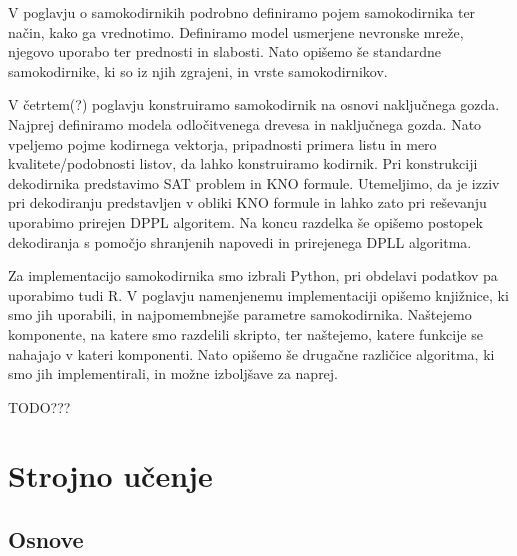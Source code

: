 \documentclass[12pt,a4paper,twoside]{article}
\theoremstyle{definition} %
\theoremstyle{plain} %
\numberwithin{equation}{section}  %
\begin{document}
V poglavju o samokodirnikih podrobno definiramo pojem samokodirnika ter način, kako ga vrednotimo.
Definiramo model usmerjene nevronske mreže, njegovo uporabo ter prednosti in slabosti.
Nato opišemo še standardne samokodirnike, ki so iz njih zgrajeni, in vrste samokodirnikov.

V četrtem(?) poglavju konstruiramo samokodirnik na osnovi naključnega gozda.
Najprej definiramo modela odločitvenega drevesa in naključnega gozda.
Nato vpeljemo pojme kodirnega vektorja, pripadnosti primera listu in mero kvalitete/podobnosti listov, da lahko konstruiramo kodirnik.
Pri konstrukciji dekodirnika predstavimo SAT problem in KNO formule. 
Utemeljimo, da je izziv pri dekodiranju predstavljen v obliki KNO formule in lahko zato pri reševanju uporabimo prirejen DPPL algoritem.
Na koncu razdelka še opišemo postopek dekodiranja s pomočjo shranjenih napovedi in prirejenega DPLL algoritma.

Za implementacijo samokodirnika smo izbrali Python, pri obdelavi podatkov pa uporabimo tudi R.
V poglavju namenjenemu implementaciji opišemo knjižnice, ki smo jih uporabili, in najpomembnejše parametre samokodirnika.
Naštejemo komponente, na katere smo razdelili skripto, ter naštejemo, katere funkcije se nahajajo v kateri komponenti.
Nato opišemo še drugačne različice algoritma, ki smo jih implementirali, in možne izboljšave za naprej.

TODO???


\section{Strojno učenje}
\label{pogl:strojno_ucenje}

\subsection{Osnove}

\end{document}
